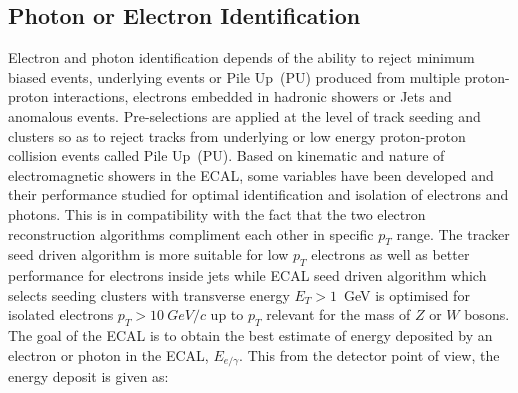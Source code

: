 \subsection{Photon or Electron Identification}
Electron and photon identification depends of the ability to reject minimum biased events, underlying events or Pile Up~(PU) produced from multiple proton-proton interactions, electrons embedded in hadronic showers or Jets and anomalous events. 
Pre-selections are applied at the level of track seeding and clusters so as to reject tracks from underlying or low energy proton-proton collision events called Pile Up~(PU).
Based on kinematic and nature of electromagnetic showers in the ECAL, some variables have been developed and their performance studied for optimal identification and isolation of electrons and photons. This is in compatibility with the fact that the two electron reconstruction algorithms compliment each other in specific $p_{T}$ range. The tracker seed driven algorithm is more suitable for low $p_{T}$ electrons as well as better performance for electrons inside jets while  ECAL seed driven algorithm which selects seeding clusters with transverse energy $E_{T} > 1$~GeV is optimised for isolated  electrons
$p_{T} > 10~GeV/c$  up to $p_{T}$ relevant for the mass of $Z$ or $W$ bosons.
\newline
The goal of the ECAL is to obtain the best estimate of energy deposited by an electron or photon in the ECAL, $E_{e/\gamma}$. This from the detector point of view, the energy deposit is given as:

